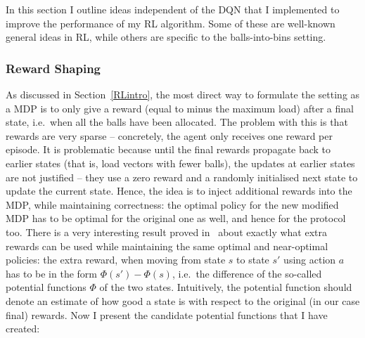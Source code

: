 In this section I outline ideas independent of the DQN that I implemented to improve the performance of my RL algorithm. Some of these are well-known general ideas in RL, while others are specific to the \TwoThinning balls-into-bins setting.


\subsubsection{Reward Shaping} \label{rewardshaping}

As discussed in Section~\ref{RLintro}, the most direct way to formulate the \TwoThinning setting as a MDP is to only give a reward (equal to minus the maximum load) after a final state, i.e.\ when all the balls have been allocated. The problem with this is that rewards are very sparse -- concretely, the agent only receives one reward per episode. It is problematic because until the final rewards propagate back to earlier states (that is, load vectors with fewer balls), the updates at earlier states are not justified -- they use a zero reward and a randomly initialised next state to update the current state. Hence, the idea is to inject additional rewards into the MDP, while maintaining correctness: the optimal policy for the new modified MDP has to be optimal for the original one as well, and hence for the \TwoThinning protocol too. There is a very interesting result proved in~\cite{ng1999rewardshaping} about exactly what extra rewards can be used while maintaining the same optimal and near-optimal policies: the extra reward, when moving from state $s$ to state $s'$ using action $a$ has to be in the form $\Phi(s')-\Phi(s)$, i.e.\ the difference of the so-called potential functions $\Phi$ of the two states. Intuitively, the potential function should denote an estimate of how good a state is with respect to the original (in our case final) rewards. Now I present the candidate potential functions that I have created:

